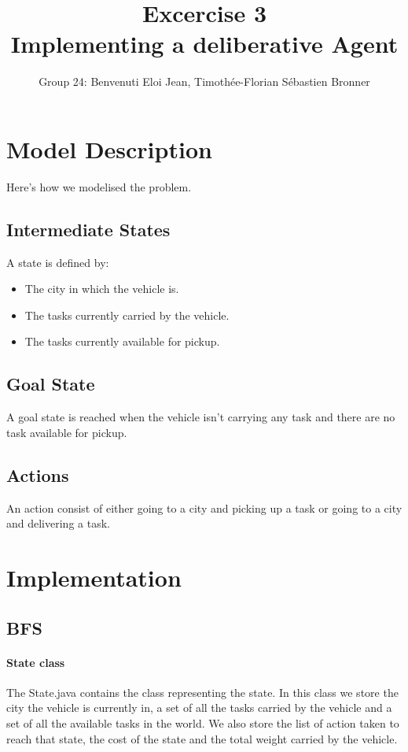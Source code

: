 \documentclass[11pt]{article}
\title{\bf Excercise 3\\ Implementing a deliberative Agent}
\author{Group 24: Benvenuti Eloi Jean, Timoth\'ee-Florian S\'ebastien Bronner}
\begin{document}
\maketitle

\section{Model Description}
Here's how we modelised the problem.

\subsection{Intermediate States}
A state is defined by:

\begin{itemize}
	\item The city in which the vehicle is.
	\item The tasks currently carried by the vehicle.
	\item The tasks currently available for pickup.
\end{itemize}
\subsection{Goal State}
A goal state is reached when the vehicle isn't carrying any task and there are no task available for pickup.

\subsection{Actions}
An action consist of either going to a city and picking up a task or going to a city and delivering a task.

\section{Implementation}

\subsection{BFS}
\paragraph{State class} The State.java contains the class representing the state. In this class we store the city the vehicle is currently in, a set of all the tasks carried by the vehicle and a set of all the available tasks in the world. We also store the list of action taken to reach that state, the cost of the state and the total weight carried by the vehicle.
\end{document}
